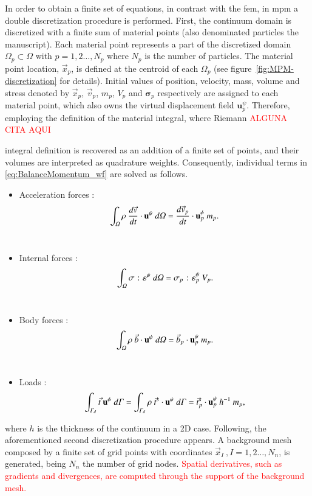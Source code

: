 \documentclass[preprint,12pt,a4paper]{elsarticle}
\newcommand{\vect}[1]{
  \ensuremath{\mathbf{{#1}}}
}
\newcommand{\tens}[1]{
  \ensuremath{\mathbf{{#1}}}
}
\newcommand{\Integral}[2]{
  \IfStrEqCase{#1}{
    {2}{\ensuremath{\int_{\varGamma_d}{#2}\ d\varGamma}}
    {3}{\ensuremath{\int_{\varOmega}{#2}\ d\varOmega}}
  }
}
\newcommand{\PNA}[1]{
  \textcolor{red}{{#1}}
}
\begin{document}
In order to obtain a finite set of equations, in contrast with the
\acrshort{fem}, in \acrshort{mpm} a double discretization procedure is
performed. First, the continuum \gls{domain} is discretized with a finite sum of material points (also denominated particles the manuscript). Each material point
represents a part of the discretized domain $\varOmega_p \subset
\varOmega$ with $p = 1,2\ldots ,N_p$ where $N_p$ is the number of
particles. The material point location, $\vec{x}_p$, is defined at the centroid
of each $\Omega_p$ (see figure~\ref{fig:MPM-discretization} for details).
Initial values of position,
velocity, mass, volume and stress denoted by $\vec{x}_p$,
$\vec{v}_p$, $m_p$,  $V_p$ and $\tens{\sigma}_p$ respectively are assigned to each material point, which also owns the
virtual displacement field $\vect{u}^{\psi}_{p}$. Therefore, employing
the definition of the material integral, where Riemann \PNA{ALGUNA CITA AQUI}
integral definition is recovered as an addition of a finite set of points, and
their volumes are interpreted as quadrature weights. Consequently,
individual terms in \eqref{eq:BalanceMomentum_wf} are solved as follows. 
\begin{itemize}
\item Acceleration forces :
\begin{equation}
    \label{eq:particle_acceleration_forces}
    \Integral{3}{\rho\ \frac{d\vec{v}}{dt} \cdot \vect{u}^{\psi}} =
    \frac{d\vec{v}_{p}}{dt} \cdot \vect{u}^{\psi}_{p}\ m_p.
  \end{equation}\\
\item Internal forces :
  \begin{equation}
    \label{eq:particle_internal_forces}
    \Integral{3}{\tens{\sigma}\ \colon \tens{\varepsilon}^{\psi}} =
   \tens{\sigma}_{p}\ \colon \tens{\varepsilon}^{\psi}_p \ V_p.
  \end{equation}\\
\item Body forces :
\begin{equation}
  \label{eq:particle_body_forces}
  \Integral{3}{\rho\ \vec{b} \cdot \vect{u}^{\psi} } = 
  \vec{b}_{p} \cdot \vect{u}^{\psi}_p\ m_p.
\end{equation}\\
\item Loads :
\begin{equation}
  \begin{aligned}
    \label{eq:particle_load_forces}
    \Integral{2}{\vec{t}\ \vect{u}^{\psi}} = \Integral{2}{\rho\
      \vec{t}^s \cdot \vect{u}^{\psi}} = \vec{t}^s_{p} \cdot \vect{u}^{\psi}_{p}\ h^{-1}\ m_p ,
  \end{aligned} 
\end{equation}
\end{itemize}
where $h$ is the thickness of the continuum in a 2D case. Following, the aforementioned second discretization procedure appears. A background mesh
composed by a finite set of grid points with coordinates $\vec{x}_I\
, I = 1,2\ldots ,N_n$, is generated, being $N_n$ the number of grid
nodes. \PNA{Spatial derivatives, such as gradients and
divergences, are computed through the support of the background mesh.}
\end{document}
